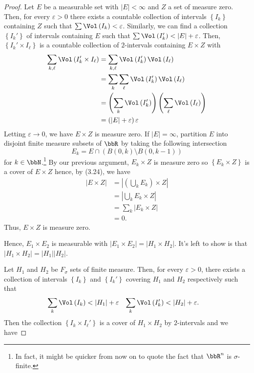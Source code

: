 \begin{proof}
Let $E$ be a measurable set with $\left|E\right|<\infty$ and $Z$ a set of
measure zero. Then, for every $\varepsilon>0$ there exists a countable
collection of intervals $\left\{I_k\right\}$ containing $Z$ such that
$\sum\Vol\left(I_k\right)<\varepsilon$. Similarly, we can find a collection
$\left\{I_k'\right\}$ of intervals containing $E$ such that
$\sum\Vol\left(I_k'\right)<\left|E\right|+\varepsilon$. Then,
$\left\{I_k'\times I_\ell\right\}$ is a countable collection of
$2$-intervals containing $E\times Z$ with
\begin{align*}
\sum_{k,\ell}\Vol\left(I_k'\times I_\ell\right)
&=\sum_{k,\ell}\Vol\left(I_k'\right)\Vol\left(I_\ell\right)\\
&=\sum_k\sum_\ell\Vol\left(I_k'\right)\Vol\left(I_\ell\right)\\
&=\left(\sum_k\Vol\left(I_k'\right)\right)
\left(\sum_\ell\Vol\left(I_\ell\right)\right)\\
&=\left(\left|E\right|+\varepsilon\right)\varepsilon
\end{align*}
Letting $\varepsilon\to 0$, we have $E\times Z$ is measure zero. If
$\left|E\right|=\infty$, partition $E$ into disjoint finite measure subsets
of $\bbR$ by taking the following intersection
\[
E_k=E\cap\left(B(0,k)\setminus B(0,k-1)\right)
\]
for $k\in\bbN$.\footnote{In fact, it might be quicker from now on to quote
  the fact that $\bbR^n$ is $\sigma$-finite.} By our previous argument,
$E_k\times Z$ is measure zero so $\left\{E_k\times Z\right\}$ is a cover of
$E\times Z$ hence, by (3.24), we have
\begin{align*}
\left|E\times Z\right|
&=\left|\left(\bigcup_k E_k\right)\times Z\right|\\
&=\left|\bigcup_k E_k\times Z\right|\\
&=\sum_k \left|E_k\times Z\right|\\
&=0.
\end{align*}
Thus, $E\times Z$ is measure zero.

Hence, $E_1\times E_2$ is measurable with $\left|E_1\times
E_2\right|=\left|H_1\times H_2\right|$. It's left to show is
that $\left|H_1\times H_2\right|=\left|H_1\right|\left|H_2\right|$.

Let $H_1$ and $H_2$ be $F_\sigma$ sets of finite measure. Then, for every
$\varepsilon>0$, there exists a collection of intervals
$\left\{I_k\right\}$ and $\left\{I_k'\right\}$ covering $H_1$ and $H_2$
respectively such that
\begin{align*}
\sum_k\Vol\left(I_k\right)&<\left|H_1\right|+\varepsilon&
\sum_k\Vol\left(I_k'\right)&<\left|H_2\right|+\varepsilon.
\end{align*}
Then the collection $\left\{I_k\times I_\ell'\right\}$ is a
cover of $H_1\times H_2$ by $2$-intervals and we have
\end{proof}
\newpage

